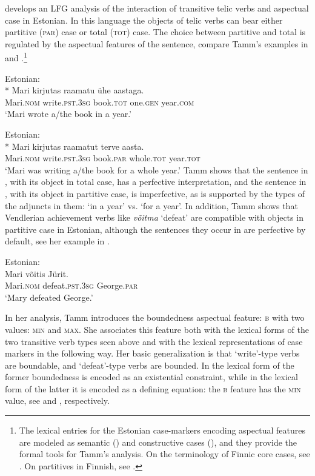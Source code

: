 \documentclass[output=paper,hidelinks]{langscibook}
\begin{document}
\citet{Tamm2006} develops an LFG analysis of the interaction of transitive telic verbs and aspectual case in Estonian. In this language the objects of telic verbs can bear either partitive (\textsc{par}) case or total (\textsc{tot}) case. The choice between partitive and total is regulated by the aspectual features of the sentence, compare Tamm's examples in  and .\footnote{The lexical entries for the Estonian case-markers encoding aspectual features are modeled as semantic (\citealt{buttking05}) and constructive cases (\citealt{NordSadlNLLT}), and they provide the formal tools for Tamm's analysis. On the terminology of Finnic core cases, see \citet{Tamm2011b,Tamm2012c}. On partitives in Finnish, see \citet{VainikkaMaling1996}.}

\ea%
    \label{ex:FinnoUgric:27}Estonian:\\*
    \gll Mari kirjutas raamatu ühe aastaga.\\
        Mari.\textsc{nom} write.\textsc{pst.}3\textsc{sg} book.\textsc{tot} one.\textsc{gen} year.\textsc{com}\\
    \glt `Mari wrote a/the book in a year.'
    \z

\ea%
    \label{ex:FinnoUgric:28}Estonian:\\*
    \gll Mari kirjutas raamatut terve aasta.\\
Mari.\textsc{nom} write.\textsc{pst.}3\textsc{sg} book.\textsc{par} whole.\textsc{tot} year.\textsc{tot}\\
\glt `Mari was writing a/the book for a whole year.'
\z
Tamm shows that the sentence in , with its object in total case, has a perfective interpretation, and the sentence in , with its object in partitive case, is imperfective, as is supported by the types of the adjuncts in them: `in a year' vs. `for a year'. In addition, Tamm shows that Vendlerian achievement verbs like \textit{võitma} `defeat' are compatible with objects in partitive case in Estonian, although the sentences they occur in are perfective by default, see her example in .

\ea%
    \label{ex:FinnoUgric:29}Estonian:\\
    \gll Mari võitis Jürit.\\
        Mari.\textsc{nom} defeat.\textsc{pst.}3\textsc{sg} George.\textsc{par}\\
    \glt `Mary defeated George.'
    \z

    In her analysis, Tamm introduces the boundedness aspectual feature: \textsc{b} with two values: \textsc{min} and \textsc{max}. She associates this feature both with the lexical forms of the two transitive verb types seen above and with the lexical representations of case markers in the following way. Her basic generalization is that `write'-type verbs are boundable, and `defeat'-type verbs are bounded. In the lexical form of the former boundedness is encoded as an existential constraint, while in the lexical form of the latter it is encoded as a defining equation: the \textsc{b} feature has the \textsc{min} value, see  and , respectively.
\end{document}
